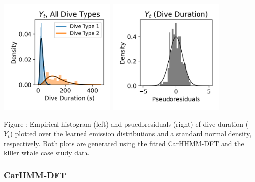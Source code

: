 \documentclass{article}
\begin{document}
        \begin{center}
        \includegraphics[width=2.25in]{../Plots/CarHHMM1_empirical_hist_dive_duration.png}
        \includegraphics[width=2.25in]{../Plots/CarHHMM1_psedoresids_Dive_Duration.png}
        \end{center}
        
        \noindent Figure : Empirical histogram (left) and psuedoresiduals (right) of dive duration ($Y_{t}$) plotted over the learned emission distributions and a standard normal density, respectively. Both plots are generated using the fitted CarHHMM-DFT and the killer whale case study data.
        \addtocounter{fignum}{1}
        
        \subsubsection{CarHMM-DFT}
        
\end{document}
